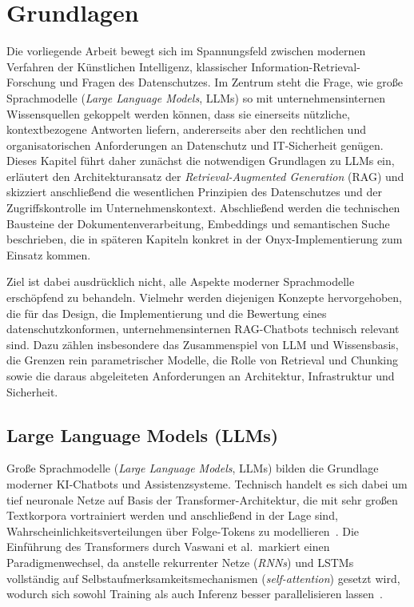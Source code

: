 \newpage
\section{Grundlagen}
\label{sec:grundlagen}

Die vorliegende Arbeit bewegt sich im Spannungsfeld zwischen modernen Verfahren der Künstlichen Intelligenz, klassischer Information-Retrieval-Forschung und Fragen des Datenschutzes.
Im Zentrum steht die Frage, wie große Sprachmodelle (\textit{Large Language Models}, LLMs) so mit unternehmensinternen Wissensquellen gekoppelt werden können, dass sie einerseits nützliche, kontextbezogene Antworten liefern, andererseits aber den rechtlichen und organisatorischen Anforderungen an Datenschutz und IT-Sicherheit genügen.
Dieses Kapitel führt daher zunächst die notwendigen Grundlagen zu LLMs ein, erläutert den Architekturansatz der \textit{Retrieval-Augmented Generation} (RAG) und skizziert anschließend die wesentlichen Prinzipien des Datenschutzes und der Zugriffskontrolle im Unternehmenskontext.
Abschließend werden die technischen Bausteine der Dokumentenverarbeitung, Embeddings und semantischen Suche beschrieben, die in späteren Kapiteln konkret in der Onyx-Implementierung zum Einsatz kommen.

Ziel ist dabei ausdrücklich nicht, alle Aspekte moderner Sprachmodelle erschöpfend zu behandeln.
Vielmehr werden diejenigen Konzepte hervorgehoben, die für das Design, die Implementierung und die Bewertung eines datenschutzkonformen, unternehmensinternen RAG-Chatbots technisch relevant sind.
Dazu zählen insbesondere das Zusammenspiel von LLM und Wissensbasis, die Grenzen rein parametrischer Modelle, die Rolle von Retrieval und Chunking sowie die daraus abgeleiteten Anforderungen an Architektur, Infrastruktur und Sicherheit.

\subsection{Large Language Models (LLMs)}
\label{subsec:grundlagen-llms}

Große Sprachmodelle (\textit{Large Language Models}, LLMs) bilden die Grundlage moderner KI-Chatbots und Assistenzsysteme.
Technisch handelt es sich dabei um tief neuronale Netze auf Basis der Transformer-Architektur, die mit sehr großen Textkorpora vortrainiert werden und anschließend in der Lage sind, Wahrscheinlichkeitsverteilungen über Folge-Tokens zu modellieren~\cite{vaswani2017attention}.
Die Einführung des Transformers durch Vaswani et al.\ markiert einen Paradigmenwechsel, da anstelle rekurrenter Netze (\textit{RNNs}) und LSTMs vollständig auf Selbstaufmerksamkeitsmechanismen (\textit{self-attention}) gesetzt wird, wodurch sich sowohl Training als auch Inferenz besser parallelisieren lassen~\cite{vaswani2017attention}.

